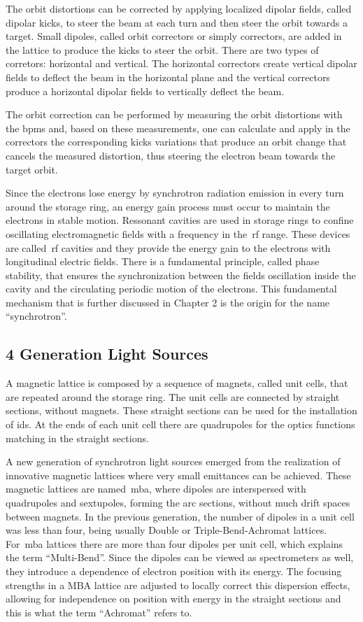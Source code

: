 The orbit distortions can be corrected by applying localized dipolar fields, called dipolar kicks, to steer the beam at each turn and then steer the orbit towards a target. Small dipoles, called orbit correctors or simply correctors, are added in the lattice to produce the kicks to steer the orbit. There are two types of corretors: horizontal and vertical. The horizontal correctors create vertical dipolar fields to deflect the beam in the horizontal plane and the vertical correctors produce a horizontal dipolar fields to vertically deflect the beam.

The orbit correction can be performed by measuring the orbit distortions with the \glspl{bpm} and, based on these measurements, one can calculate and apply in the correctors the corresponding kicks variations that produce an orbit change that cancels the measured distortion, thus steering the electron beam towards the target orbit.

Since the electrons lose energy by synchrotron radiation emission in every turn around the storage ring, an energy gain process must occur to maintain the electrons in stable motion. Ressonant cavities are used in storage rings to confine oscillating electromagnetic fields with a frequency in the~\gls{rf} range. These devices are called~\gls{rf} cavities and they provide the energy gain to the electrons with longitudinal electric fields. There is a fundamental principle, called phase stability, that ensures the synchronization between the fields oscillation inside the cavity and the circulating periodic motion of the electrons. This fundamental mechanism that is further discussed in Chapter 2 is the origin for the name ``synchrotron''.
\subsection{4 Generation Light Sources}\label{subsec:fourth_generation}
A magnetic lattice is composed by a sequence of magnets, called unit cells, that are repeated around the storage ring. The unit cells are connected by straight sections, without magnets. These straight sections can be used for the installation of \glspl{id}. At the ends of each unit cell there are quadrupoles for the optics functions matching in the straight sections.

A new generation of synchrotron light sources emerged from the realization of innovative magnetic lattices where very small emittances can be achieved. These magnetic lattices are named~\gls{mba}, where dipoles are interspersed with quadrupoles and sextupoles, forming the arc sections, without much drift spaces between magnets. In the previous generation, the number of dipoles in a unit cell was less than four, being usually Double or Triple-Bend-Achromat lattices. For~\gls{mba} lattices there are more than four dipoles per unit cell, which explains the term ``Multi-Bend''. Since the dipoles can be viewed as spectrometers as well, they introduce a dependence of electron position with its energy. The focusing strengths in a MBA lattice are adjusted to locally correct this dispersion effects, allowing for independence on position with energy in the straight sections and this is what the term ``Achromat'' refers to. 

